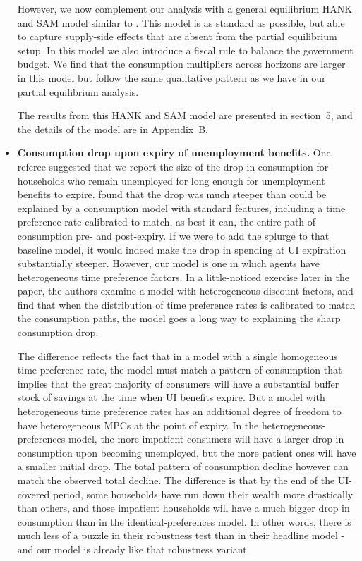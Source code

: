 \begin{itemize}
	However, we now complement our analysis with a general equilibrium HANK and SAM model similar to \citet{Ravn2017,Ravn2021}. This model is as standard as possible, but able to capture supply-side effects that are absent from the partial equilibrium setup. In this model we also introduce a fiscal rule to balance the government budget. We find that the consumption multipliers across horizons are larger in this model but follow the same qualitative pattern as we have in our partial equilibrium analysis.
	
	The results from this HANK and SAM model are presented in section~5, and the details of the model are in Appendix~B.
	
      \item \textbf{Consumption drop upon expiry of unemployment benefits.} One referee suggested that we report the size of the drop in consumption for households who remain unemployed for long enough for unemployment benefits to expire.  \citet{ganongConsumer2019} found that the drop was much steeper than could be explained by a consumption model with standard features, including a time preference rate calibrated to match, as best it can, the entire path of consumption pre- and post-expiry.  If we were to add the splurge to that baseline model, it would indeed make the drop in spending at UI expiration substantially steeper. However, our model is one in which agents have heterogeneous time preference factors.  In a little-noticed exercise later in the \citeauthor{ganongConsumer2019} paper, the authors examine a model with heterogeneous discount factors, and find that when the distribution of time preference rates is calibrated to match the consumption paths, the model goes a long way to explaining the sharp consumption drop. 
      
      The difference reflects the fact that in a model with a single homogeneous time preference rate, the model must match a pattern of consumption that implies that the great majority of consumers will have a substantial buffer stock of savings at the time when UI benefits expire.  But a model with heterogeneous time preference rates has an additional degree of freedom to have heterogeneous MPCs at the point of expiry.  In the heterogeneous-preferences model, the more impatient consumers will have a larger drop in consumption upon becoming unemployed, but the more patient ones will have a smaller initial drop. The total pattern of consumption decline however can match the observed total decline.  The difference is that by the end of the UI-covered period, some households have run down their wealth more drastically than others, and those impatient households will have a much bigger drop in consumption than in the identical-preferences model.  In other words, there is much less of a puzzle in their robustness test than in their headline model - and our model is already like that robustness variant.
      

\end{itemize}
